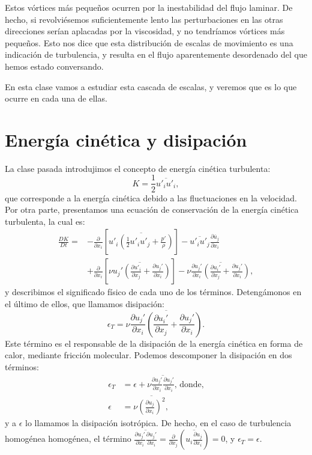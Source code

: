 Estos vórtices más pequeños ocurren por la inestabilidad del flujo laminar. 
De hecho, si revolviésemos suficientemente lento las perturbaciones en las otras direcciones serían aplacadas por la viscosidad, y no tendríamos vórtices más pequeños.
Esto nos dice que esta distribución de escalas de movimiento es una indicación de turbulencia, y resulta en el flujo aparentemente desordenado del que hemos estado conversando.

En esta clase vamos a estudiar esta cascada de escalas, y veremos que es lo que ocurre en cada una de ellas.

\section*{Energía cinética y disipación}

La clase pasada introdujimos el concepto de energía cinética turbulenta:
%
\begin{equation}
K = \frac{1}{2}\overline{u'_iu'_i},
\end{equation}
%
que corresponde a la energía cinética debido a las fluctuaciones en la velocidad.
Por otra parte, presentamos una ecuación de conservación de la energía cinética turbulenta, la cual es:
%
\begin{align}\label{eq:K_conservacion}
\frac{DK}{Dt} =& -\frac{\partial}{\partial x_i} \left[ \overline{u'_i\left(\frac{1}{2}u'_iu'_j+\frac{p'}{\rho}\right)}\right] - \overline{u'_iu'_j}\frac{\partial\overline{u}_j}{\partial x_i} \nonumber\\
               & + \frac{\partial}{\partial x_i}\left[\overline{\nu u_j'\left(\frac{\partial u'_i}{\partial x_j} + \frac{\partial u_j'}{\partial x_i}\right)}\right] -\nu\overline{\frac{\partial u_j'}{\partial x_i}\left(\frac{\partial u_i'}{\partial x_j}+\frac{\partial u_j'}{\partial x_i}\right)},
\end{align}
%
y describimos el significado físico de cada uno de los términos.
Detengámonos en el último de ellos, que llamamos disipación:
%
\begin{equation}\label{eq:disipacion}
\epsilon_T = \nu\overline{\frac{\partial u_j'}{\partial x_i}\left(\frac{\partial u_i'}{\partial x_j}+\frac{\partial u_j'}{\partial x_i}\right)}.
\end{equation}
%
Este término es el responsable de la disipación de la energía cinética en forma de calor, mediante fricción molecular. 
Podemos descomponer la disipación en dos términos:
%
\begin{align} \label{eq:disipacion_iso}
\epsilon_T &= \epsilon + \nu\overline{\frac{\partial u_j'}{\partial x_i}\frac{\partial u_j'}{\partial x_i}} \text{, donde,} \nonumber \\
\epsilon &= \nu\overline{\left(\frac{\partial u_j}{\partial x_i}\right)^2},
\end{align}
%
y a $\epsilon$ lo llamamos la disipación isotrópica.
De hecho, en el caso de turbulencia homogénea homogénea, el término $\overline{\frac{\partial u_j'}{\partial x_i}\frac{\partial u_j'}{\partial x_i}}= \frac{\partial}{\partial x_j}\left(\overline{u_i\frac{\partial u_j}{\partial x_i}}\right) = 0$, y $\epsilon_T=\epsilon$.

